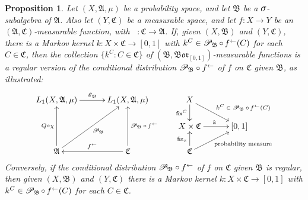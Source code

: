 \documentclass[
twoside=true,
paper=letter,
fontsize=9pt,
pagesize=auto,
leqno,
openany,
headsepline,
overfullrule,
]{scrbook}
\theoremstyle{plain}
\theoremstyle{plain}
\newtheorem{prop}[thm]{Proposition}
\theoremstyle{definition}
\theoremstyle{bfnoteitalic}
\theoremstyle{bfnoteroman}
\newcommand{\sigalg}[1]{\mathfrak{#1}}
\newcommand{\cali}[1]{\mathscr{#1}}
\newcommand{\sfop}[1]{\mathsf{#1}}
\newcommand{\condexpop}[1]{\mathop{\cali{E}\hspace{-1pt}}\nolimits_{#1}}
\newcommand{\condprobop}[1]{\mathop{\cali{P}\hspace{-1pt}}\nolimits_{#1}}
\newcommand{\borel}{\mathfrak{Bor}}
\newcommand{\textsigma}{\hbox{\large{$\sigma$}}\kern-1pt}
\newcommand{\preimage}[1]{\mathop{#1^{\leftarrow}}}
\newcommand{\sigmaalgebra}{\sigalg{A}}
\newcommand{\sigmaalgebraii}{\sigalg{B}}
\newcommand{\sigmaalgebraiii}{\sigalg{C}}
\newcommand{\Lone}{L_1(\measurespace, \sigmaalgebra, \measure)}
\newcommand{\function}{f}
\newcommand{\measurespace}{X}
\newcommand{\measurespaceii}{Y}
\newcommand{\mspaceelt}{x}
\newcommand{\measure}{\mu}
\newcommand{\setiii}{C}
\newcommand{\markovkernel}{k}
\newcommand{\fixinthefirst}[1]{\sfop{fix}_{#1}}
\newcommand{\fixinthesecond}[1]{\sfop{fix}^{#1}}
\begin{document}
\begin{prop}\label{equivalent_definition_regular_distribution}
Let $(\measurespace, \sigmaalgebra, \measure)$ be a probability space, and let $\sigmaalgebraii$ be a $\textsigma$-subalgebra of $\sigmaalgebra$. Also let $(\measurespaceii, \sigmaalgebraiii)$ be a measurable space, and let 
$\function:\measurespace\to\measurespaceii$ be an
$(\sigmaalgebra, \sigmaalgebraiii)$\hyp{}measurable function, with
$\preimage{\function} : \sigmaalgebraiii \to \sigmaalgebra$.
If, given $(\measurespace, \sigmaalgebraii)$ and $(\measurespaceii, \sigmaalgebraiii)$, 
there is a Markov kernel $\markovkernel:\measurespace\times\sigmaalgebraiii\to [0,1]$ with 
$\markovkernel^{\setiii} \in \condprobop{\sigmaalgebraii}\circ \preimage{\function}(\setiii)$ for each
$\setiii\in\sigmaalgebraiii$, then the collection 
$\{ 
\markovkernel^{\setiii}
: 
\setiii\in\sigmaalgebraiii
\}$
of $(\sigmaalgebraii,\borel_{[0,1]})$\hyp{}measurable functions
is a regular version of the conditional distribution ${\condprobop{\sigmaalgebraii}}\circ \preimage{\function}$ of 
$\function$ on $\sigmaalgebraiii$ given $\sigmaalgebraii$, as illustrated:
\[
\xymatrix@R=16pt@C=30pt{ 
\Lone \ar[r]^{\condexpop{\sigmaalgebraii}}
& \Lone 
& \measurespace 
\ar[d]_-{\fixinthesecond{\setiii}} 
\ar[dr]^{\qquad\text{$\markovkernel^{\setiii} \in \condprobop{\sigmaalgebraii}\circ \preimage{\function}(\setiii)$}}
\\
& 
& \measurespace\times\sigmaalgebraiii \ar[r]^{\markovkernel} 
& [0,1] 
\\
\sigmaalgebra \ar[uu]^{Q\circ\chi} \ar[uur]_{\condprobop{\sigmaalgebraii}} 
& \sigmaalgebraiii 
\ar[uu]_{\condprobop{\sigmaalgebraii}\circ \preimage{\function}} 
\ar[l]_{\preimage{\function}}
& \sigmaalgebraiii \ar[ur]_{\qquad\text{probability measure}} \ar[u]^{\fixinthefirst{\mspaceelt}} 
& 
\\
}
\]
Conversely, if the conditional distribution
${\condprobop{\sigmaalgebraii}}\circ \preimage{\function}$ 
of 
$\function$ on $\sigmaalgebraiii$ given $\sigmaalgebraii$ is regular, then
given $(\measurespace, \sigmaalgebraii)$ and $(\measurespaceii, \sigmaalgebraiii)$ 
there is a Markov kernel $k:\measurespace\times\sigmaalgebraiii\to [0,1]$ with 
$k^{\setiii} \in
\condprobop{\sigmaalgebraii}\circ \preimage{\function}(\setiii)$ for each 
$\setiii\in\sigmaalgebraiii$.
\end{prop}
\end{document}
